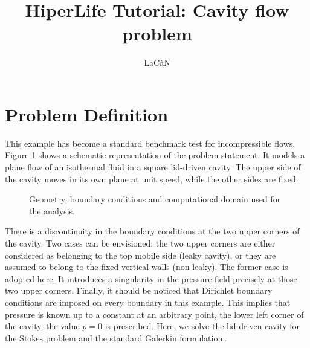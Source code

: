 \documentclass[]{article}
\begin{document}
\title{HiperLife Tutorial: Cavity flow problem}
\author{LaCàN}
\maketitle

\linenumbers

\section{Problem Definition} \label{sec: pd} 
This example has become a standard benchmark test for incompressible flows. Figure \ref{fig_SB} shows a schematic representation of the problem statement. It models a plane flow of an isothermal fluid in a square lid-driven cavity. The upper side of the cavity moves in its own plane at unit speed, while the other sides are fixed.

\begin{figure}[htbp]
	\centering
	
	\caption{Geometry, boundary conditions and computational domain used for the analysis.}
	\label{fig_SB}
\end{figure}
There is a discontinuity in the boundary conditions at the two upper corners of the cavity. Two cases can be envisioned: the two upper corners are either considered as belonging to the top mobile side (leaky cavity), or they are assumed to belong to the fixed vertical walls (non-leaky). The former case is adopted here. It introduces a singularity in the pressure field precisely at those two upper corners. Finally, it should be noticed that Dirichlet boundary conditions are imposed on every boundary in this example. This implies that pressure is known up to a constant at an arbitrary point, the lower left corner of the cavity, the value $p = 0$ is prescribed. Here, we solve the lid-driven cavity for the Stokes problem and the standard Galerkin formulation.\cite{donea2003finite}.
\end{document}
